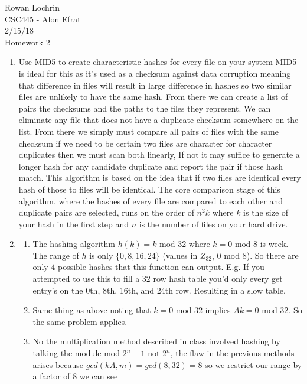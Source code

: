 \documentclass[11pt]{article}
\begin{document}
\begin{flushleft}
	Rowan Lochrin \\
	CSC445 - Alon Efrat\\
	2/15/18 \\
	Homework 2
\end{flushleft}
\begin{enumerate}
	\item Use MID5 to create characteristic hashes for every file on your
		system MID5 is ideal for this as it's used as a checksum against
		data corruption meaning that difference in files will result in
		large difference in hashes so two similar files are unlikely to
		have the same hash. From there we can create a list of pairs the
		checksums and the paths to the files they represent. We can
		eliminate any file that does not have a duplicate checksum
		somewhere on the list. From there we simply must compare all
		pairs of files with the same checksum if we need to be certain
		two files are character for character duplicates then we must
		scan both linearly, If not it may suffice to generate a longer
		hash for any candidate duplicate and report the pair if those
		hash match.
		This algorithm is based on the idea that if two files are
		identical every hash of those to files will be identical. The
		core comparison stage of this algorithm, where the hashes of
		every file are compared to each other and duplicate pairs are
		selected, runs on the order of $n^2k$ where $k$ is the size of
		your hash in the first step and $n$ is the number of files on
		your hard drive.
	\item 
		\begin{enumerate}
			\item The hashing algorithm $h(k) = k\text{ mod }32$ where $k =
				0 \text{ mod } 8$ is week. The range of $h$ is only
				$\{0,8,16,24\}$ (values in $Z_{32}$, $0$ mod
				$8$). So there are only $4$ possible
				hashes that this function can output. E.g. If
				you attempted to use this to fill a $32$ row
				hash table you'd only every get entry's on the
				0th, 8th, 16th, and 24th row. Resulting in a
				slow table.
			\item Same thing as above noting that $k = 0 \text{ mod
				} 32$ implies  $Ak = 0 \text{ mod } 32$.
				So the same problem applies.
			\item No the multiplication method described in class
				involved hashing by talking the module mod $2^n
				-1$ not $2^n$, the flaw in the previous methods
				arises because $gcd(kA,m) = gcd(8,32) = 8$ so we
				restrict our range by a factor of $8$ we can see

\end{enumerate}
\end{enumerate}
\end{document}
